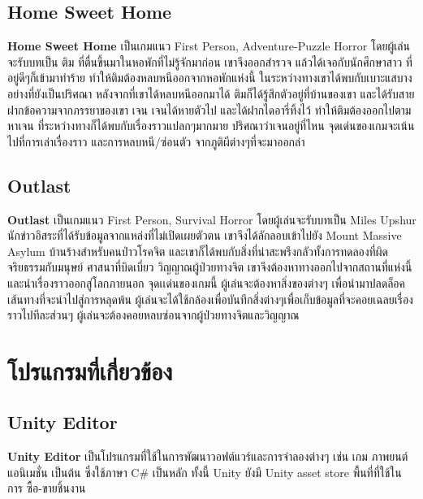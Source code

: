 \subsection{Home Sweet Home}
\subsubitem \textbf{Home Sweet Home} เป็นเกมแนว First Person, Adventure-Puzzle Horror โดยผู้เล่นจะรับบทเป็น ติม ที่ตื่นขึ้นมาในหอพักที่ไม่รู้จักมาก่อน เขาจึงออกสำรวจ แล้วได้เจอกับนักศึกษาสาว ที่อยู่ดีๆก็เข้ามาทำร้าย ทำให้ติมต้องหลบหนีออกจากหอพักแห่งนี้ ในระหว่างทางเขาได้พบกับเบาะแสบางอย่างที่ยังเป็นปริศณา หลังจากที่เขาได้หลบหนีออกมาได้ ติมก็ได้รู้สึกตัวอยู่ที่บ้านของเขา และได้รับสายฝากข้อความจากภรรยาของเขา เจน เจนได้หายตัวไป และได้ฝากไดอารี่ทิ้งไว้ ทำให้ติมต้องออกไปตามหาเจน ที่ระหว่างทางก็ได้พบกับเรื่องราวแปลกๆมากมาย ปริศณาว่าเจนอยู่ที่ไหน จุดเด่นของเกมจะเน้นไปที่การเล่าเรื่องราว และการหลบหนี/ซ่อนตัว จากภูติผีต่างๆที่จะมาออกล่า

\subsection{Outlast}
\subsubitem \textbf{Outlast} เป็นเกมแนว First Person, Survival Horror โดยผู้เล่นจะรับบทเป็น Miles Upshur นักข่าวอิสระที่ได้รับข้อมูลจากแหล่งที่ไม่เปิดเผยตัวตน เขาจึงได้ลักลอบเข้าไปยัง Mount Massive Asylum บ้านร้างสำหรับคนป่าวโรคจิต และเขาก็ได้พบกับสิ่งที่น่าสะพรึงกลัวทั้งการทดลองที่ผิดจริยธรรมกับมนุษย์ ศาสนาที่บิดเบี่ยว วิญญาณผู้ป่วยทางจิต เขาจึงต้องหาทางออกไปจากสถานที่แห่งนี้ และนำเรื่องราวออกสู่โลกภายนอก จุดเเด่นของเกมนี้ ผู้เล่นจะต้องหาสิ่งของต่างๆ เพื่อนำมาปลดล็อคเส้นทางที่จะนำไปสู่การหลุดพ้น ผู้เล่นจะได้ใช้กล้องเพื่อบันทึกสิ่งต่างๆเพื่อเก็บข้อมูลที่จะคอยเฉลยเรื่องราวไปทีละส่วนๆ ผู้เล่นจะต้องคอยหลบซ่อนจากผู้ป่วยทางจิตและวิญญาณ



\section{โปรแกรมที่เกี่ยวข้อง}
\subsection{Unity Editor}
\subsubitem \textbf{Unity Editor} เป็นโปรแกรมที่ใช้ในการพัฒนาวอฟต์แวร์และการจำลองต่างๆ เช่น เกม ภาพยนต์ แอนิเมชั่น เป็นต้น ซึ่งใช้ภาษา C$\#$ เป็นหลัก ทั้งนี้ Unity ยังมี Unity asset store พื้นที่ที่ใช้ในการ ซื้อ-ขายชิ้นงาน

